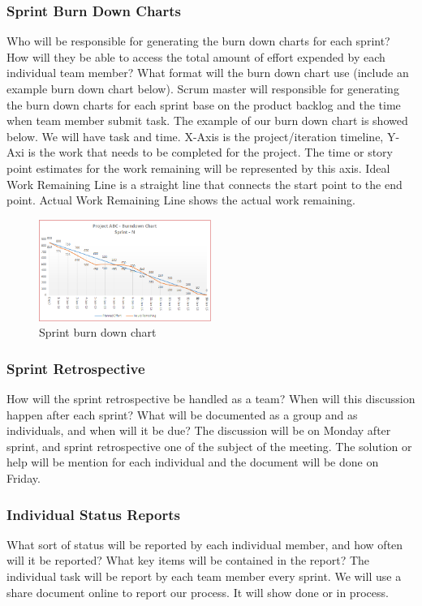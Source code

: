 \subsubsection{Sprint Burn Down Charts}
Who will be responsible for generating the burn down charts for each sprint? How will they be able to access the total amount of effort expended by each individual team member? What format will the burn down chart use (include an example burn down chart below).
Scrum master will responsible for generating the burn down charts for each sprint base on the product backlog and the time when team member submit task. The example of our burn down chart is showed below. We will have task and time. X-Axis is the project/iteration timeline, Y-Axi is the work that needs to be completed for the project. The time or story point estimates for the work remaining will be represented by this axis. Ideal Work Remaining Line is a straight line that connects the start point to the end point. Actual Work Remaining Line shows the actual work remaining.

\begin{figure}[h!]
    \centering
    \includegraphics[width=0.5\textwidth]{images/burn_down_chart}
    \caption{Sprint burn down chart}
\end{figure}

\subsubsection{Sprint Retrospective}
How will the sprint retrospective be handled as a team? When will this discussion happen after each sprint? What will be documented as a group and as individuals, and when will it be due?
The discussion will be on Monday after sprint, and sprint retrospective one of the subject of the meeting. The solution or help will be mention for each individual and the document will be done on Friday.


\subsubsection{Individual Status Reports}
What sort of status will be reported by each individual member, and how often will it be reported? What key items will be contained in the report?
The individual task will be report by each team member every sprint. We will use a share document online to report our process. It will show done or in process.
